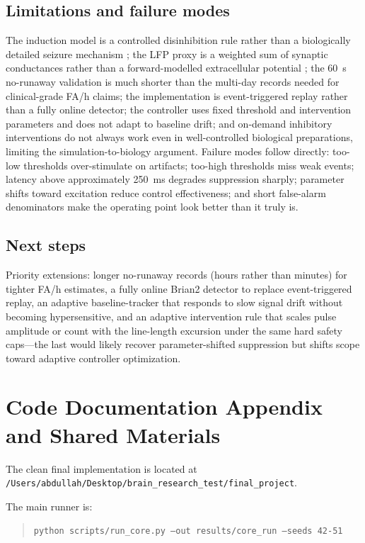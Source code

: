 \documentclass[12pt]{article}
\begin{document}
\subsection{Limitations and failure modes}
The induction model is a controlled disinhibition rule rather than a biologically detailed seizure mechanism \cite{maheshwari2014}; the LFP proxy is a weighted sum of synaptic conductances rather than a forward-modelled extracellular potential \cite{einevoll2013}; the 60~s no-runaway validation is much shorter than the multi-day records needed for clinical-grade FA/h claims; the implementation is event-triggered replay rather than a fully online detector; the controller uses fixed threshold and intervention parameters and does not adapt to baseline drift; and on-demand inhibitory interventions do not always work even in well-controlled biological preparations, limiting the simulation-to-biology argument. Failure modes follow directly: too-low thresholds over-stimulate on artifacts; too-high thresholds miss weak events; latency above approximately 250~ms degrades suppression sharply; parameter shifts toward excitation reduce control effectiveness; and short false-alarm denominators make the operating point look better than it truly is.

\subsection{Next steps}
Priority extensions: longer no-runaway records (hours rather than minutes) for tighter FA/h estimates, a fully online Brian2 detector to replace event-triggered replay, an adaptive baseline-tracker that responds to slow signal drift without becoming hypersensitive, and an adaptive intervention rule that scales pulse amplitude or count with the line-length excursion under the same hard safety caps---the last would likely recover parameter-shifted suppression but shifts scope toward adaptive controller optimization.

\clearpage
\appendix
\section{Code Documentation Appendix and Shared Materials}
The clean final implementation is located at \texttt{/Users/abdullah/Desktop/brain\_research\_test/final\_project}.

The main runner is:
\begin{quote}
\small\texttt{python scripts/run\_core.py --out results/core\_run --seeds 42-51}
\end{quote}
\end{document}
